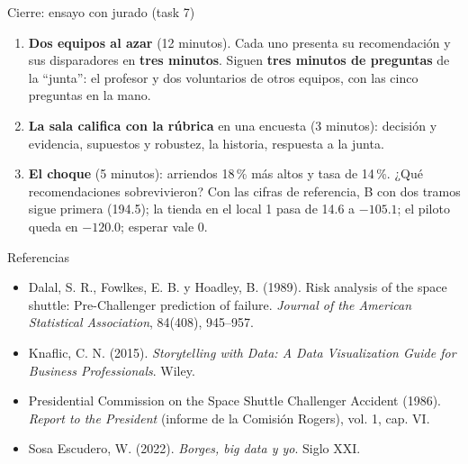 \documentclass{beamer}
\begin{document}
\begin{frame}{Cierre: ensayo con jurado (task 7)}
\begin{enumerate}\itemsep5pt
  \item \textbf{Dos equipos al azar} (12 minutos). Cada uno presenta su recomendación y sus disparadores en \textbf{tres minutos}. Siguen \textbf{tres minutos de preguntas} de la ``junta'': el profesor y dos voluntarios de otros equipos, con las cinco preguntas en la mano.
  \item \textbf{La sala califica con la rúbrica} en una encuesta (3 minutos): decisión y evidencia, supuestos y robustez, la historia, respuesta a la junta.
  \item \textbf{El choque} (5 minutos): arriendos 18\,\% más altos y tasa de 14\,\%. ¿Qué recomendaciones sobrevivieron? Con las cifras de referencia, B con dos tramos sigue primera (194.5); la tienda en el local 1 pasa de 14.6 a $-105.1$; el piloto queda en $-120.0$; esperar vale 0.
\end{enumerate}
\medskip
{}
\end{frame}

\begin{frame}{Referencias}
\small
\begin{itemize}\itemsep5pt
  \item Dalal, S. R., Fowlkes, E. B. y Hoadley, B. (1989). Risk analysis of the space shuttle: Pre-Challenger prediction of failure. \emph{Journal of the American Statistical Association}, 84(408), 945--957.
  \item Knaflic, C. N. (2015). \emph{Storytelling with Data: A Data Visualization Guide for Business Professionals}. Wiley.
  \item Presidential Commission on the Space Shuttle Challenger Accident (1986). \emph{Report to the President} (informe de la Comisión Rogers), vol. 1, cap. VI.
  \item Sosa Escudero, W. (2022). \emph{Borges, big data y yo}. Siglo XXI.
\end{itemize}
\end{frame}
\end{document}
